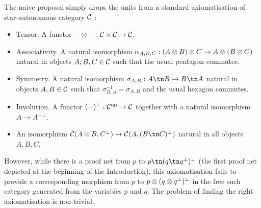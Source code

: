 \documentclass{robincs}
\newcommand\staraut{star-aut\-on\-om\-ous\xspace}
\newif\ifcomments\commentsfalse
\newcommand\comment[2][]{\ifcomments\marginpar{#1\raggedright\tiny#2}\fi}
\newcommand\dcomment{\comment[D]}%
\renewcommand\perp{^\bot}
\newcommand\perpp{\perp{}\perp}
\newcommand\dual[1]{#1\perp}
\begin{document}
The naive proposal simply drops the units from a standard
axiomatisation of \staraut category $\mathcal{C}$ \citep{BarrStac}:
\begin{itemize}
\item Tensor. A functor $-\otimes-:\mathcal{C}\times \mathcal{C}\to\mathcal{C}$.
\item Associativity. 
%
A natural isomorphism 
\(
  \alpha_{A,B,C}:(A\otimes B)\otimes C\to A\otimes(B\otimes C)
\)
natural in objects $A,B,C\in\mathcal{C}$ such that the usual pentagon commutes.

\item \vspace*{-.5ex}Symmetry.
%
A natural isomorphism $\sigma_{A,B}:A\tn B\to B\tn A$ natural in
objects $A,B\in\mathcal{C}$ such that $\sigma_{B,A}^{-1}=\sigma_{A,B}$
and the usual hexagon commutes.

\item \vspace*{-1ex}Involution.
%
A functor $(-)\perp:\C\op\to\C$ together with a natural isomorphism
$A\to A\perpp$.
\item An isomorphism $\C(A\tensor B,C\perp)\to\C(A,(B\tn C)\perp)$
  natural in all objects $A,B,C$.
\end{itemize}
However, while there is a proof net from $p$ to $p\tn (q\tn\dual{q})\perp$
(the first proof net depicted at the beginning of the
Introduction), this axiomatisation fails to provide a corresponding
morphism from $p$ to $p\otimes (q\tensor \dual{q})\perp$ in the free
such category generated from the variables $p$ and $q$.
%
The problem of finding the right axiomatisation is
non-trivial.
\end{document}
